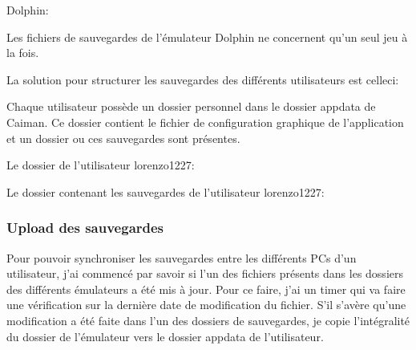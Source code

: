 \documentclass[a4paper,12pt,french]{sphinxmanual}
\begin{document}
\sphinxAtStartPar
Dolphin:

\sphinxAtStartPar
Les fichiers de sauvegardes de l’émulateur Dolphin ne concernent qu’un seul jeu à la fois.

\sphinxAtStartPar
{}

\sphinxAtStartPar
La solution pour structurer les sauvegardes des différents utilisateurs est celle\sphinxhyphen{}ci:

\sphinxAtStartPar
Chaque utilisateur possède un dossier personnel dans le dossier appdata de Caiman. Ce dossier contient le fichier de configuration graphique de l’application et un dossier ou ces sauvegardes sont présentes.

\sphinxAtStartPar
Le dossier de l’utilisateur lorenzo1227:

\sphinxAtStartPar
{}

\sphinxAtStartPar
Le dossier contenant les sauvegardes de l’utilisateur lorenzo1227:

\sphinxAtStartPar
{}


\subsubsection{Upload des sauvegardes}
\label{\detokenize{organique:upload-des-sauvegardes}}
\sphinxAtStartPar
Pour pouvoir synchroniser les sauvegardes entre les différents PCs d’un utilisateur, j’ai commencé par savoir si l’un des fichiers présents dans les dossiers des différents émulateurs a été mis à jour. Pour ce faire, j’ai un timer qui va faire une vérification sur la dernière date de modification du fichier. S’il s’avère qu’une modification a été faite dans l’un des dossiers de sauvegardes, je copie l’intégralité du dossier de l’émulateur vers le dossier appdata de l’utilisateur.
\end{document}
